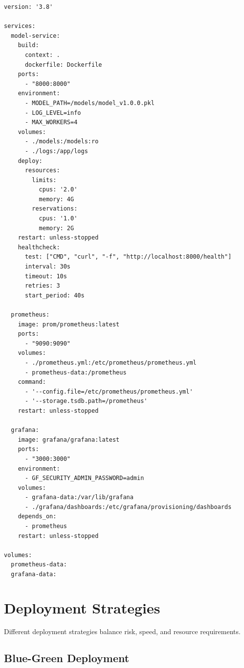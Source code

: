 \begin{lstlisting}[style=yaml, caption={Docker Compose Configuration}]
version: '3.8'

services:
  model-service:
    build:
      context: .
      dockerfile: Dockerfile
    ports:
      - "8000:8000"
    environment:
      - MODEL_PATH=/models/model_v1.0.0.pkl
      - LOG_LEVEL=info
      - MAX_WORKERS=4
    volumes:
      - ./models:/models:ro
      - ./logs:/app/logs
    deploy:
      resources:
        limits:
          cpus: '2.0'
          memory: 4G
        reservations:
          cpus: '1.0'
          memory: 2G
    restart: unless-stopped
    healthcheck:
      test: ["CMD", "curl", "-f", "http://localhost:8000/health"]
      interval: 30s
      timeout: 10s
      retries: 3
      start_period: 40s

  prometheus:
    image: prom/prometheus:latest
    ports:
      - "9090:9090"
    volumes:
      - ./prometheus.yml:/etc/prometheus/prometheus.yml
      - prometheus-data:/prometheus
    command:
      - '--config.file=/etc/prometheus/prometheus.yml'
      - '--storage.tsdb.path=/prometheus'
    restart: unless-stopped

  grafana:
    image: grafana/grafana:latest
    ports:
      - "3000:3000"
    environment:
      - GF_SECURITY_ADMIN_PASSWORD=admin
    volumes:
      - grafana-data:/var/lib/grafana
      - ./grafana/dashboards:/etc/grafana/provisioning/dashboards
    depends_on:
      - prometheus
    restart: unless-stopped

volumes:
  prometheus-data:
  grafana-data:
\end{lstlisting}

\section{Deployment Strategies}

Different deployment strategies balance risk, speed, and resource requirements.

\subsection{Blue-Green Deployment}

